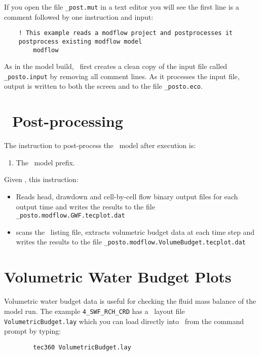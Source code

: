 If you open the file \texttt{\_post.mut} in a text editor you will see the first  line is a comment followed by one instruction and input:
\squish
\begin{verbatim}
    ! This example reads a modflow project and postprocesses it
    postprocess existing modflow model
        modflow
\end{verbatim}
As in the model build, \mut\ first creates a clean copy of the input file called \texttt{\_posto.input} by removing all comment lines.
 As it processes the input file, output is written to both the screen and to the file \texttt{\_posto.eco}.

\section{\mut\ Post-processing}
The instruction to post-process the \mfus\ model after execution is:

    {
        \squish
        \begin{enumerate}
        \item {}  The \mfus\ model prefix.
        \end{enumerate}
        Given , this instruction:
         \begin{itemize}
            \item  Reads head, drawdown and cell-by-cell flow binary output files for each output time and writes the results to the file {\tt \_posto.modflow.GWF.tecplot.dat}
            \item scans the \mfus\ listing file, extracts volumetric budget data at each time step and writes the results to the file {\tt \_posto.modflow.VolumeBudget.tecplot.dat}
         \end{itemize}
        \squish
    }

\section{Volumetric Water Budget Plots}
Volumetric water budget data is useful for checking the fluid mass balance of the model run.  The example {\tt 4\_SWF\_RCH\_CRD} has a \tecplot\ layout file {\tt VolumetricBudget.lay} which you can load directly into \tecplot\ from the command prompt by typing:
    \begin{verbatim}
        tec360 VolumetricBudget.lay
    \end{verbatim}

